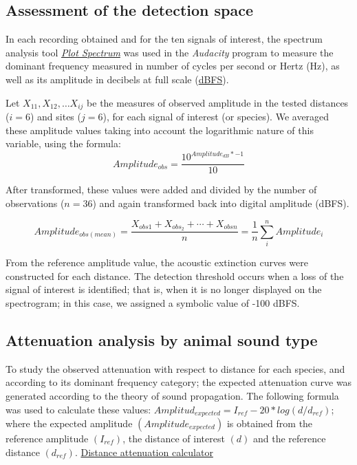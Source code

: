 \documentclass[fleqn,10pt,lineno]{wlpeerj} %
\begin{document}
\hypertarget{assessment-of-the-detection-space}{%
\subsection*{Assessment of the detection
space}\label{assessment-of-the-detection-space}}

In each recording obtained and for the ten signals of interest, the
spectrum analysis tool
\href{file:///C:/Program\%20Files\%20(x86)/Audacity/help/manual/man/plot_spectrum.html}{\emph{Plot
Spectrum}} was used in the \emph{Audacity} program to measure the
dominant frequency measured in number of cycles per second or Hertz
(Hz), as well as its amplitude in decibels at full scale
(\href{https://en.wikipedia.org/wiki/DBFS}{dBFS}).

Let \(X_{11}, X_{12},\ldots X_{ij}\) be the measures of observed
amplitude in the tested distances (\(i = 6\)) and sites (\(j = 6\)), for
each signal of interest (or species). We averaged these amplitude values
taking into account the logarithmic nature of this variable, using the
formula: \[Amplitude_{obs} = \frac{10^{Amplitude_{dB}*{-1}}}{10}\]

After transformed, these values were added and divided by the number of
observations (\(n = 36\)) and again transformed back into digital
amplitude (dBFS).

\[Amplitude_{obs(mean)} = \frac{X_{obs1} + X_{obs_2} + \cdots + X_{obsn}} {n}
      = \frac{1}{n}\sum_{i}^{n} Amplitude_{i} \]

From the reference amplitude value, the acoustic extinction curves were
constructed for each distance. The detection threshold occurs when a
loss of the signal of interest is identified; that is, when it is no
longer displayed on the spectrogram; in this case, we assigned a
symbolic value of -100 dBFS.

\hypertarget{attenuation-analysis-by-animal-sound-type}{%
\subsection*{Attenuation analysis by animal sound
type}\label{attenuation-analysis-by-animal-sound-type}}

To study the observed attenuation with respect to distance for each
species, and according to its dominant frequency category; the expected
attenuation curve was generated according to the theory of sound
propagation. The following formula was used to calculate these values:
\(Amplitud_{expected} = I_{ref}-20*log(d/d_{ref})\); where the expected
amplitude \((Amplitude_{expected})\) is obtained from the reference
amplitude \((I_{ref})\), the distance of interest \((d)\) and the
reference distance \((d_{ref})\).
\href{https://www.omnicalculator.com/physics/distance-attenuation\#inverse-square-law}{Distance
attenuation calculator}
\end{document}
